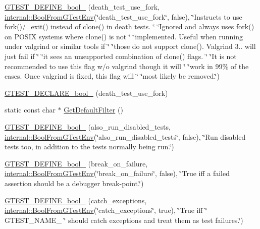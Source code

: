 \begin{DoxyCompactItemize}
\item 
\hyperlink{namespacetesting_a428e5944490e497df683cb8324ce4489}{G\+T\+E\+S\+T\+\_\+\+D\+E\+F\+I\+N\+E\+\_\+bool\+\_\+} (death\+\_\+test\+\_\+use\+\_\+fork, \hyperlink{namespacetesting_1_1internal_a67132cdce23fb71b6c38ee34ef81eb4c}{internal\+::\+Bool\+From\+G\+Test\+Env}(\char`\"{}death\+\_\+test\+\_\+use\+\_\+fork\char`\"{}, false), \char`\"{}Instructs to use fork()/\+\_\+exit() instead of clone() in death tests. \char`\"{} \char`\"{}Ignored and always uses fork() on P\+O\+S\+IX systems where clone() is not \char`\"{} \char`\"{}implemented. Useful when running under valgrind or similar tools if \char`\"{} \char`\"{}those do not support clone(). Valgrind 3.. will just fail if \char`\"{} \char`\"{}it sees an unsupported combination of clone() flags. \char`\"{} \char`\"{}It is not recommended to use this flag w/o valgrind though it will \char`\"{} \char`\"{}work in 99\% of the cases. Once valgrind is fixed, this flag will \char`\"{} \char`\"{}most likely be removed.\char`\"{})
\item 
\hyperlink{namespacetesting_a534f0743e7c42c55d27dcd0dd3d38f18}{G\+T\+E\+S\+T\+\_\+\+D\+E\+C\+L\+A\+R\+E\+\_\+bool\+\_\+} (death\+\_\+test\+\_\+use\+\_\+fork)
\item 
static const char $\ast$ \hyperlink{namespacetesting_a56fbc164c7dc53596c23e519d8f1ca3c}{Get\+Default\+Filter} ()
\item 
\hyperlink{namespacetesting_ad72f215c805a46fba44cb09d717b01ef}{G\+T\+E\+S\+T\+\_\+\+D\+E\+F\+I\+N\+E\+\_\+bool\+\_\+} (also\+\_\+run\+\_\+disabled\+\_\+tests, \hyperlink{namespacetesting_1_1internal_a67132cdce23fb71b6c38ee34ef81eb4c}{internal\+::\+Bool\+From\+G\+Test\+Env}(\char`\"{}also\+\_\+run\+\_\+disabled\+\_\+tests\char`\"{}, false), \char`\"{}Run disabled tests too, in addition to the tests normally being run.\char`\"{})
\item 
\hyperlink{namespacetesting_a5ab9e9cc2ee1addddfb2f4b43dd4e402}{G\+T\+E\+S\+T\+\_\+\+D\+E\+F\+I\+N\+E\+\_\+bool\+\_\+} (break\+\_\+on\+\_\+failure, \hyperlink{namespacetesting_1_1internal_a67132cdce23fb71b6c38ee34ef81eb4c}{internal\+::\+Bool\+From\+G\+Test\+Env}(\char`\"{}break\+\_\+on\+\_\+failure\char`\"{}, false), \char`\"{}True iff a failed assertion should be a debugger break-\/point.\char`\"{})
\item 
\hyperlink{namespacetesting_a96c82869676822ec883043aefb6dd042}{G\+T\+E\+S\+T\+\_\+\+D\+E\+F\+I\+N\+E\+\_\+bool\+\_\+} (catch\+\_\+exceptions, \hyperlink{namespacetesting_1_1internal_a67132cdce23fb71b6c38ee34ef81eb4c}{internal\+::\+Bool\+From\+G\+Test\+Env}(\char`\"{}catch\+\_\+exceptions\char`\"{}, true), \char`\"{}True iff \char`\"{} G\+T\+E\+S\+T\+\_\+\+N\+A\+M\+E\+\_\+ \char`\"{} should catch exceptions and treat them as test failures.\char`\"{})

\end{DoxyCompactItemize}
